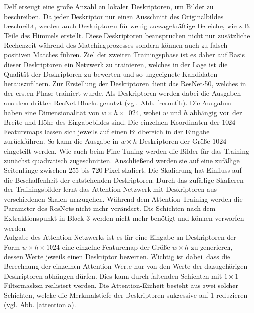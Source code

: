 Delf erzeugt eine große Anzahl an lokalen Deskriptoren, um Bilder zu beschreiben. Da jeder Deskriptor nur einen Ausschnitt des Originalbildes beschreibt, werden auch Deskriptoren für wenig aussagekräftige Bereiche, wie z.B. Teile des Himmels erstellt. Diese Deskriptoren beanspruchen nicht nur zusätzliche Rechenzeit während des Matchingprozesses sondern können auch zu falsch positiven Matches führen. Ziel der zweiten Trainingsphase ist es daher auf Basis dieser Deskriptoren ein Netzwerk zu trainieren, welches in der Lage ist die Qualität der Deskriptoren zu bewerten und so ungeeignete Kandidaten herauszufiltern. 
Zur Erstellung der Deskriptoren dient das ResNet-50, welches in der ersten Phase trainiert wurde. Als Deskriptoren werden dabei die Ausgaben aus dem dritten ResNet-Blocks genutzt (vgl. Abb. \ref{resnet}b). Die Ausgaben haben eine Dimensionalität von $w\times h\times 1024$, wobei $w$ und $h$ abhängig von der Breite und Höhe des Eingabebildes sind. Die einzelnen Koordinaten der $1024$ Featuremaps lassen sich jeweils auf einen Bildbereich in der Eingabe zurückführen. So kann die Ausgabe in $w \times h$ Deskriptoren der Größe $1024$ eingeteilt werden. Wie auch beim Fine-Tuning werden die Bilder für das Training zunächst quadratisch zugeschnitten. Anschließend werden sie auf eine zufällige Seitenlänge zwischen $255$ bis $720$ Pixel skaliert. Die Skalierung hat Einfluss auf die Beschaffenheit der entstehenden Deskriptoren. Durch das zufällige Skalieren der Trainingsbilder lernt das Attention-Netzwerk mit Deskriptoren aus verschiedenen Skalen umzugehen. Während dem Attention-Training werden die Parameter des ResNets nicht mehr verändert. Die Schichten nach dem Extraktionspunkt in Block 3 werden nicht mehr benötigt und können verworfen werden. \\
Aufgabe des Attention-Netzwerks ist es für eine Eingabe an Deskriptoren der Form $w\times h\times 1024$ eine einzelne Featuremap der Größe $w\times h$ zu generieren, dessen Werte jeweils einen Deskriptor bewerten. Wichtig ist dabei, dass die Berechnung der einzelnen Attention-Werte nur von den Werte der dazugehörigen Deskriptoren abhängen dürfen. Dies kann durch faltenden Schichten mit $1\times1$-Filtermasken realisiert werden. Die Attention-Einheit besteht aus zwei solcher Schichten, welche die Merkmalstiefe der Deskriptoren sukzessive auf $1$ reduzieren (vgl. Abb. \ref{attention}a).  

